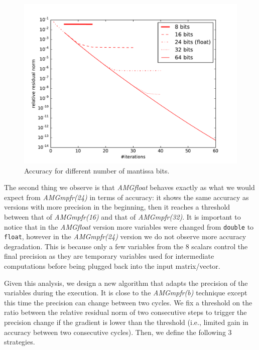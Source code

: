 \begin{figure}[htb]
    \centering
    \includegraphics[width=0.9\linewidth]{figs/bits_convergence.pdf}
    \caption{Accuracy for different number of mantissa bits.}
    \label{fig.bits_accuracy}
\end{figure}

The second thing we observe is that \emph{AMGfloat} 
behaves exactly as what we would expect from
\emph{AMGmpfr(24)} in terms of accuracy: it shows the same accuracy as versions
with more precision in the beginning, then it reaches a threshold between that
of \emph{AMGmpfr(16)} and that of \emph{AMGmpfr(32)}. It is important to
notice that in the \emph{AMGfloat} version more variables were changed from
\texttt{double} to \texttt{float}, however in the \emph{AMGmpfr(24)} version we
do not observe more accuracy degradation. This is because only a few
variables from the 8 scalars control the final precision as they are temporary
variables used for intermediate computations before being plugged back into the
input matrix/vector.

Given this analysis, we design a new algorithm that adapts the precision of the
variables during the execution. It is close to the \emph{AMGmpfr(b)} technique
except this time the precision can change between two cycles.  We fix a
threshold on the ratio between the relative residual norm of two consecutive
steps to trigger the precision change if the gradient is lower than the
threshold (i.e., limited gain in accuracy between two consecutive cycles). Then,
we define the following 3 strategies.

